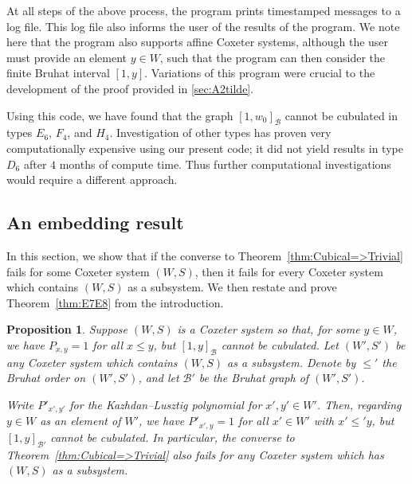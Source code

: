 \documentclass[11pt]{amsart}
\theoremstyle{plain}
\newtheorem{prop}[thm]{Proposition}
\theoremstyle{definition}
\newcommand{\cB}{\mathcal B}
\newcommand{\Pxy}{P_{x,y}} %
\numberwithin{equation}{subsection}
\begin{document}
At all steps of the above process, the program prints timestamped messages to a log file.
This log file also informs the user of the results of the program.
We note here that the program also supports affine Coxeter systems, although the user must provide an element $y\in W$, such that the program can then consider
the finite Bruhat interval $[1,y]$.
Variations of this program were crucial to the development of the proof provided in \cref{sec:A2tilde}.




Using this code, we have found that the graph $[1,w_0]_{\cB}$ cannot be cubulated in types $E_6$, $F_4$, and $H_4$. 
Investigation of other types has proven very computationally expensive using our present code; it did not yield results in type $D_6$ after $4$ months of compute time. Thus further computational investigations would require a different approach.








\subsection{An embedding result}\label{sec:embedding}

In this section, we show that if the converse to Theorem~\ref{thm:Cubical=>Trivial} fails for some Coxeter system $(W,S)$, then it fails for every Coxeter system which contains $(W,S)$ as a subsystem. We then restate and prove Theorem~\ref{thm:E7E8} from the introduction.

\begin{prop}\label{prop:embedding}
  Suppose $(W,S)$ is a Coxeter system so that, for some $y \in W$, we have $\Pxy = 1$ for all $x \leq y$, but $[1,y]_\cB$ cannot be cubulated. Let $(W',S')$ be any Coxeter system which contains $(W,S)$ as a subsystem. Denote by\/ $\leq'$ the Bruhat order on $(W',S')$, and let $\cB'$ be the Bruhat graph of $(W',S')$.

Write $P'_{x',y'}$ for the Kazhdan--Lusztig polynomial for $x',y' \in W'$. Then, regarding $y \in W$ as an element of $W'$, we have $P'_{x',y} = 1$ for all $x' \in W'$ with $x' \leq' y$, but $[1,y]_{\cB'}$ cannot be cubulated. In particular, the converse to Theorem~\ref{thm:Cubical=>Trivial} also fails for any Coxeter system which has $(W,S)$ as a subsystem.
\end{prop}
\end{document}
